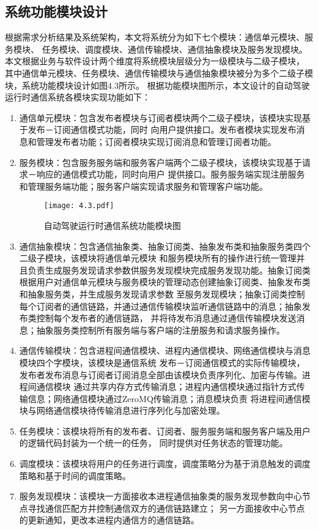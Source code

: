 \subsection{系统功能模块设计}
根据需求分析结果及系统架构，本文将系统分为如下七个模块：通信单元模块、服务模块、
任务模块、调度模块、通信传输模块、通信抽象模块及服务发现模块。本文根据业务与软件设计两个维度将系统模块层级分为一级模块与二级子模块，
其中通信单元模块、任务模块、通信传输模块与通信抽象模块被分为多个二级子模块，系统功能模块设计如图4.3所示。
根据功能模块图所示，本文设计的自动驾驶运行时通信系统各模块实现功能如下：
\begin{enumerate}
  \item 通信单元模块：包含发布者模块与订阅者模块两个二级子模块，该模块实现基于发布－订阅通信模式功能，同时
  向用户提供接口。发布者模块实现发布消息和管理发布者功能；订阅者模块实现订阅消息和管理订阅者功能。
  \item 服务模块：包含服务服务端和服务客户端两个二级子模块，该模块实现基于请求－响应的通信模式功能，同时向用户
  提供接口。服务服务端实现注册服务和管理服务端功能；服务客户端实现请求服务和管理客户端功能。
  \begin{figure}[htb]
    \centering
    \texttt{[image: 4.3.pdf]}
    \caption{自动驾驶运行时通信系统功能模块图}
    \label{fig:22}
  \end{figure}
  \item 通信抽象模块：包含通信抽象类、抽象订阅类、抽象发布类和抽象服务类四个二级子模块，该模块将通信单元模块
  和服务模块所有的操作进行统一管理并且负责生成服务发现请求参数供服务发现模块完成服务发现功能。抽象订阅类
  根据用户对通信单元模块与服务模块的管理动态创建抽象订阅类、抽象发布类和抽象服务类，并生成服务发现请求参数
  至服务发现模块；抽象订阅类控制每个订阅者的通信链路，并通过通信传输模块监听通信链路中的消息；抽象发布类控制每个发布者的通信链路，
  并将待发布消息通过通信传输模块发送消息；抽象服务类控制所有服务端与客户端的注册服务和请求服务操作。
  \item 通信传输模块：包含进程间通信模块、进程内通信模块、网络通信模块与消息模块四个字模块，该模块是通信系统
  发布－订阅通信模式的实际传输模块，发布者发布消息与订阅者订阅消息全部由该模块负责序列化、加密与传输。进程间通信模块
  通过共享内存方式传输消息；进程内通信模块通过指针方式传输信息；网络通信模块通过ZeroMQ传输消息；消息模块负责
  将进程间通信模块与网络通信模块待传输消息进行序列化与加密处理。
  \item 任务模块：该模块将所有的发布者、订阅者、服务服务端和服务客户端及用户的逻辑代码封装为一个统一的任务，
  同时提供对任务状态的管理功能。
  \item 调度模块：该模块将用户的任务进行调度，调度策略分为基于消息触发的调度策略和基于时间的调度策略。
  \item 服务发现模块：该模块一方面接收本进程通信抽象类的服务发现参数向中心节点寻找通信匹配方并控制通信双方的通信链路建立；
  另一方面接收中心节点的更新通知，更改本进程内通信方的通信链路。
\end{enumerate}


